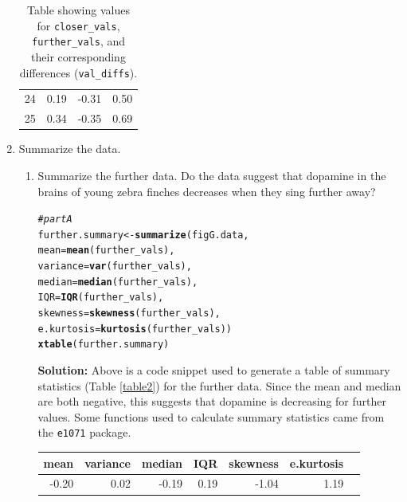 \documentclass{article}\usepackage[]{graphicx}\usepackage[]{xcolor}
\makeatletter
\newcommand{\hlcom}[1]{\textcolor[rgb]{0.678,0.584,0.686}{\textit{#1}}}%
\newcommand{\hldef}[1]{\textcolor[rgb]{0.345,0.345,0.345}{#1}}%
\newcommand{\hlkwb}[1]{\textcolor[rgb]{0.69,0.353,0.396}{#1}}%
\newcommand{\hlkwc}[1]{\textcolor[rgb]{0.333,0.667,0.333}{#1}}%
\newcommand{\hlkwd}[1]{\textcolor[rgb]{0.737,0.353,0.396}{\textbf{#1}}}%
\newenvironment{kframe}{%
 \def\at@end@of@kframe{}%
 \ifinner\ifhmode%
  \def\at@end@of@kframe{\end{minipage}}%
  \begin{minipage}{\columnwidth}%
 \fi\fi%
 \def\FrameCommand##1{\hskip\@totalleftmargin \hskip-\fboxsep
 \colorbox{shadecolor}{##1}\hskip-\fboxsep
     \hskip-\linewidth \hskip-\@totalleftmargin \hskip\columnwidth}%
 \MakeFramed {\advance\hsize-\width
   \@totalleftmargin\z@ \linewidth\hsize
   \@setminipage}}%
 {\par\unskip\endMakeFramed%
 \at@end@of@kframe}
\newenvironment{knitrout}{}{} %
\makeatother
\begin{document}
\begin{enumerate}
\begin{table}[ht]
\begin{tabular}{rrrr}
  24 & 0.19 & -0.31 & 0.50 \\ 
  25 & 0.34 & -0.35 & 0.69 \\ 
   \hline
\end{tabular}
\caption{Table showing values for \texttt{closer\_vals}, \texttt{further\_vals}, and their corresponding differences (\texttt{val\_diffs}).}
\label{table1}
\end{table}
\newpage
\item Summarize the data.
\begin{enumerate}
  \item Summarize the further data. Do the data suggest that
   dopamine in the brains of young zebra finches decreases when
   they sing further away?
\begin{knitrout}
\color{fgcolor}\begin{kframe}
\begin{alltt}
\hlcom{# part A}
\hldef{further.summary} \hlkwb{<-} \hlkwd{summarize}\hldef{(figG.data,}
                         \hlkwc{mean} \hldef{=} \hlkwd{mean}\hldef{(further_vals),}
                         \hlkwc{variance} \hldef{=} \hlkwd{var}\hldef{(further_vals),}
                         \hlkwc{median} \hldef{=} \hlkwd{median}\hldef{(further_vals),}
                         \hlkwc{IQR} \hldef{=} \hlkwd{IQR}\hldef{(further_vals),}
                         \hlkwc{skewness} \hldef{=} \hlkwd{skewness}\hldef{(further_vals),}
                         \hlkwc{e.kurtosis} \hldef{=} \hlkwd{kurtosis}\hldef{(further_vals))}
\hlkwd{xtable}\hldef{(further.summary)}
\end{alltt}
\end{kframe}
\end{knitrout}
\textbf{Solution:} Above is a code snippet used to generate a table of summary statistics (Table \ref{table2}) for the further data. Since the mean and median are both negative, this suggests that dopamine is decreasing for further values. Some functions used to calculate summary statistics came from the \texttt{e1071} \citep{e1071} package.
\begin{table}[ht]
\centering
\begin{tabular}{rrrrrrr}
  \hline
 mean & variance & median & IQR & skewness & e.kurtosis \\ 
  \hline
-0.20 & 0.02 & -0.19 & 0.19 & -1.04 & 1.19 \\ 

\end{tabular}
\end{table}
\end{enumerate}
\end{enumerate}
\end{document}
